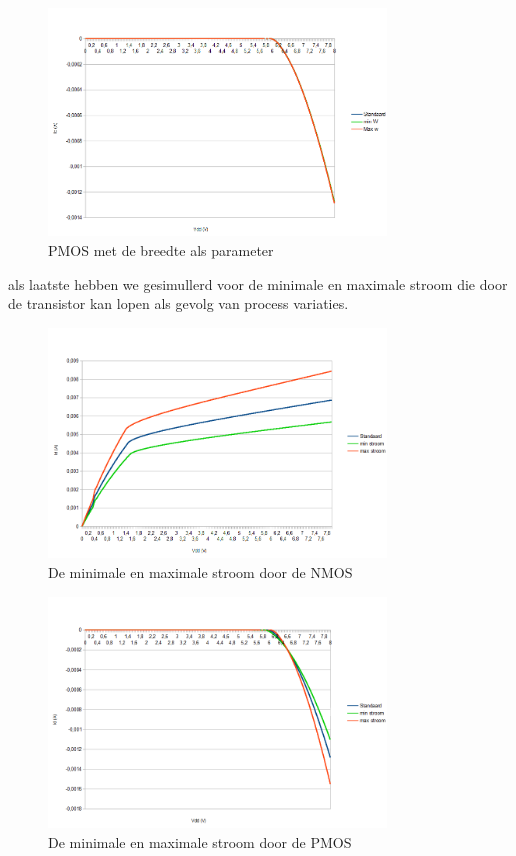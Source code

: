\documentclass{article}
\begin{document}
\begin{figure}[H]
	\centering
	\includegraphics[width=0.8\textwidth]{pmosbreedte}
	\caption{PMOS met de breedte als parameter}
\end{figure}
\clearpage

als laatste hebben we gesimullerd voor de minimale en maximale stroom die door de transistor kan lopen als gevolg van process variaties.

\begin{figure}[H]
	\centering
	\includegraphics[width=0.8\textwidth]{nmosminmax}
	\caption{De minimale en maximale stroom door de NMOS}
\end{figure}

\begin{figure}[H]
	\centering
	\includegraphics[width=0.8\textwidth]{pmosminmax}
	\caption{De minimale en maximale stroom door de PMOS}
\end{figure}
\end{document}
